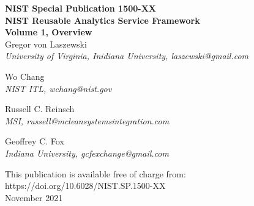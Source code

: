 \documentclass[12pt]{article}
\newcommand{\pubnumber}{1500-XX}
\newcommand{\DOI}{https://doi.org/10.6028/NIST.SP.1500-XX}
\newcommand{\monthyear}{November 2021}
\newcommand{\TITLE}{NIST Reusable Analytics Service Framework\\
Volume 1, Overview}
\begin{document}
\begin{titlepage}

\begin{flushright}
\LARGE{\textbf{NIST Special Publication \pubnumber}}\\
\vfill 
\Huge{\textbf{\TITLE}}\\
\vfill
\normalsize Gregor von Laszewski\\
\textit{University of Virginia, Inidiana University, laszewski@gmail.com}\\
\vspace{12pt}

Wo Chang\\
\textit{NIST ITL, wchang@nist.gov}\\
\vspace{12pt}

\normalsize Russell C. Reinsch \\
\textit{MSI, russell@mcleansystemsintegration.com}\\
\vspace{12pt}

\normalsize Geoffrey C. Fox\\
\textit{Indiana University, gcfexchange@gmail.com}
\vspace{12pt}

\vfill
\normalsize This publication is available free of charge from:\\
\DOI\\
\vfill
\normalsize \monthyear
\vfill


\end{flushright}
\end{titlepage}
\end{document}
